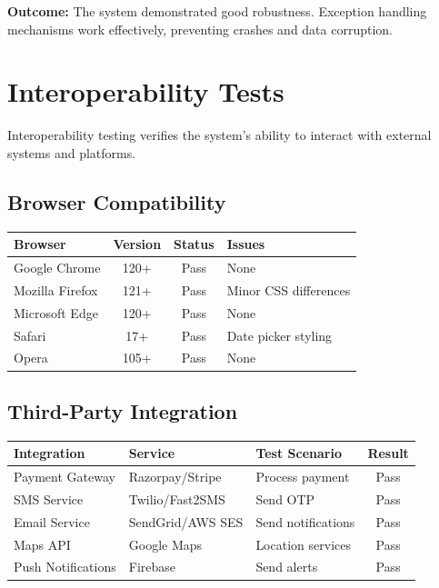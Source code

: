 \documentclass[12pt,a4paper]{report}
\begin{document}
\textbf{Outcome:} The system demonstrated good robustness. Exception handling mechanisms work effectively, preventing crashes and data corruption.

\section{Interoperability Tests}
Interoperability testing verifies the system's ability to interact with external systems and platforms.

\subsection{Browser Compatibility}

\begin{longtable}{|p{3cm}|c|c|p{3cm}|}
\hline
\textbf{Browser} & \textbf{Version} & \textbf{Status} & \textbf{Issues} \\
\hline
\endfirsthead
Google Chrome & 120+ & Pass & None \\
\hline
Mozilla Firefox & 121+ & Pass & Minor CSS differences \\
\hline
Microsoft Edge & 120+ & Pass & None \\
\hline
Safari & 17+ & Pass & Date picker styling \\
\hline
Opera & 105+ & Pass & None \\
\hline
\end{longtable}

\subsection{Third-Party Integration}

\begin{longtable}{|p{3cm}|p{3cm}|p{4cm}|c|}
\hline
\textbf{Integration} & \textbf{Service} & \textbf{Test Scenario} & \textbf{Result} \\
\hline
\endfirsthead
Payment Gateway & Razorpay/Stripe & Process payment & Pass \\
\hline
SMS Service & Twilio/Fast2SMS & Send OTP & Pass \\
\hline
Email Service & SendGrid/AWS SES & Send notifications & Pass \\
\hline
Maps API & Google Maps & Location services & Pass \\
\hline
Push Notifications & Firebase & Send alerts & Pass \\
\hline
\end{longtable}
\end{document}
